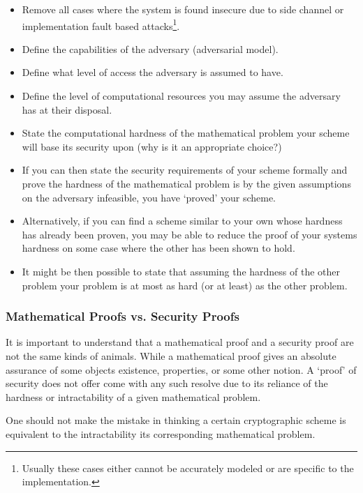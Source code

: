 \begin{itemize}
   \item Remove all cases where the system is found insecure due to side channel or implementation fault based attacks\footnote{Usually these cases either cannot be accurately modeled or are specific to the implementation.}.
    \item Define the capabilities of the adversary (adversarial model).
    \item Define what level of access the adversary is assumed to have.
    \item Define the level of computational resources you may assume the adversary has at their disposal.
    \item State the computational hardness of the mathematical problem your scheme will base its security upon (why is it an appropriate choice?)
    \item If you can then state the security requirements of your scheme formally and prove the hardness of the mathematical problem is by the given assumptions on the adversary infeasible, you have `proved' your scheme.
    \item Alternatively, if you can find a scheme similar to your own whose hardness has already been proven, you may be able to reduce the proof of your systems hardness on some case where the other has been shown to hold.
    \item It might be then possible to state that assuming the hardness of the other problem your problem is at most as hard (or at least) as the other problem.
\end{itemize}




\subsubsection{Mathematical Proofs vs. Security Proofs}

It is important to understand that a mathematical proof and a security proof are not the same kinds of animals. While a mathematical proof gives an absolute assurance of some objects existence, properties, or some other notion. A `proof' of security does not offer come with any such resolve due to its reliance of the hardness or intractability of a given mathematical problem. 


One should not make the mistake in thinking a certain cryptographic scheme is equivalent to the intractability its corresponding mathematical problem. 

